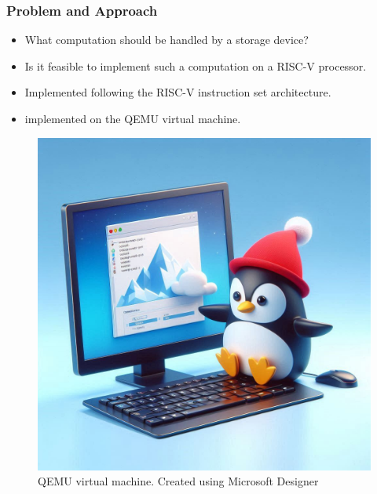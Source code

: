 \begin{frame}[hoved]
	\frametitle{Problem and Approach}
	\begin{minipage}[t]{0.45\textwidth}
		\begin{itemize}
			\item What computation should be handled by a storage device?
			\item Is it feasible to implement such a computation on a RISC-V
			      processor.
			\item Implemented following the RISC-V instruction set architecture.
			\item implemented on the QEMU virtual machine.
		\end{itemize}
	\end{minipage}
	\hfill
	\begin{minipage}[t]{0.45\textwidth}
		\begin{figure}
			\begin{center}
				\includegraphics[height=0.55\textheight]{figures/qemuvirt.jpeg}
			\end{center}
			\caption{QEMU virtual machine. {\tiny Created using Microsoft
						Designer}}\label{fig:qemu}
		\end{figure}
	\end{minipage}
\end{frame}

